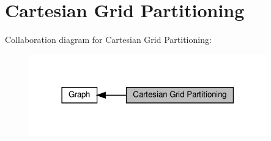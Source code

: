 \hypertarget{group__group__cgp}{}\section{Cartesian Grid Partitioning}
\label{group__group__cgp}
Collaboration diagram for Cartesian Grid Partitioning\+:
\nopagebreak
\begin{figure}[H]
\begin{center}
\leavevmode
\includegraphics[width=290pt]{group__group__cgp}
\end{center}
\end{figure}
